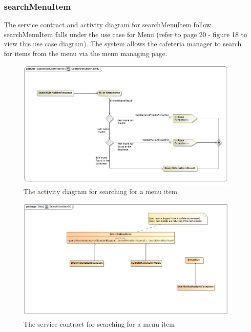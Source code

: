 \documentclass[a4paper,12pt]{report}
\begin{document}
 \subsubsection{searchMenuItem}
The service contract and activity diagram for searchMenuItem follow. searchMenuItem falls under the use case for Menu (refer to page 20 - figure 18 to view this use case diagram). The system allows the cafeteria manager to search for items from the menu via the menu managing page.
\begin{figure}[H]
  \centering
    \includegraphics[width=1.0\textwidth]{../images/SearchMenuItemActivity.jpg}
    \caption{The activity diagram for searching for a menu item } 
\end{figure}
\begin{figure}[H]
	\centering
	\includegraphics[width=1.0\textwidth]{../images/SearchMenuItemSC.jpg}
	\caption{The service contract for searching for a menu item}
\end{figure}
\end{document}
